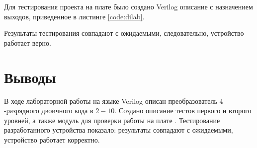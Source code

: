 Для тестирования проекта на плате было создано Verilog описание с назначением выходов, приведенное в листинге  \ref{code:dilab}.


Результаты тестирования совпадают с ожидаемыми, следовательно, устройство работает верно.

\section{Выводы}

В ходе лабораторной работы на языке Verilog описан преобразователь $4$-разрядного двоичного кода в $2-10$. Создано описание тестов первого и второго уровней, а также модуль для проверки работы на плате . Тестирование разработанного устройства показало: результаты совпадают с ожидаемыми, устройство работает корректно.

